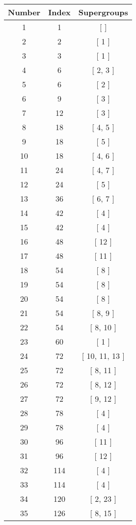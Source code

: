 \begin{center}
\begin{longtable}[H]{|| c c c ||}
\hline
Number & Index & Supergroups \\ 
\hline
1 & 1 & [ ] \\ 
\hline
2 & 2 & [ 1 ] \\ 
\hline
3 & 3 & [ 1 ] \\ 
\hline
4 & 6 & [ 2, 3 ] \\ 
\hline
5 & 6 & [ 2 ] \\ 
\hline
6 & 9 & [ 3 ] \\ 
\hline
7 & 12 & [ 3 ] \\ 
\hline
8 & 18 & [ 4, 5 ] \\ 
\hline
9 & 18 & [ 5 ] \\ 
\hline
10 & 18 & [ 4, 6 ] \\ 
\hline
11 & 24 & [ 4, 7 ] \\ 
\hline
12 & 24 & [ 5 ] \\ 
\hline
13 & 36 & [ 6, 7 ] \\ 
\hline
14 & 42 & [ 4 ] \\ 
\hline
15 & 42 & [ 4 ] \\ 
\hline
16 & 48 & [ 12 ] \\ 
\hline
17 & 48 & [ 11 ] \\ 
\hline
18 & 54 & [ 8 ] \\ 
\hline
19 & 54 & [ 8 ] \\ 
\hline
20 & 54 & [ 8 ] \\ 
\hline
21 & 54 & [ 8, 9 ] \\ 
\hline
22 & 54 & [ 8, 10 ] \\ 
\hline
23 & 60 & [ 1 ] \\ 
\hline
24 & 72 & [ 10, 11, 13 ] \\ 
\hline
25 & 72 & [ 8, 11 ] \\ 
\hline
26 & 72 & [ 8, 12 ] \\ 
\hline
27 & 72 & [ 9, 12 ] \\ 
\hline
28 & 78 & [ 4 ] \\ 
\hline
29 & 78 & [ 4 ] \\ 
\hline
30 & 96 & [ 11 ] \\ 
\hline
31 & 96 & [ 12 ] \\ 
\hline
32 & 114 & [ 4 ] \\ 
\hline
33 & 114 & [ 4 ] \\ 
\hline
34 & 120 & [ 2, 23 ] \\ 
\hline
35 & 126 & [ 8, 15 ] \\ 
\hline

\end{longtable}
\end{center}
